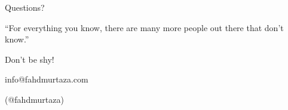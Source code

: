 \documentclass[10pt]{beamer}
\begin{document}
    \begin{frame}
        
    \end{frame}
    
    \begin{frame}[standout]
        \begin{Huge}
            Questions?
        \end{Huge}

        \vfill{}
        ``For everything you know, there are many more people out there that don't know.''
        
        \vfill{}
        \begin{large}
            Don't be shy!
        \end{large}

        \vfill{}

        \begin{center}
            info@fahdmurtaza.com 

            (@fahdmurtaza)
        \end{center}
    \end{frame}
\end{document}

